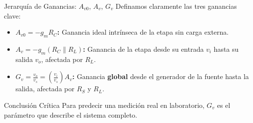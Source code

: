 \documentclass[aspectratio=169, table, xcdraw]{beamer}
\begin{document}
\begin{frame}{Jerarquía de Ganancias: $A_{v0}$, $A_v$, $G_v$}
    Definamos claramente las tres ganancias clave:
    
    \vspace{0.3cm}
    \begin{itemize}
        \item \textbf{$A_{v0} = -g_m R_C$:} Ganancia ideal intrínseca de la etapa sin carga externa.
        \item \textbf{$A_v = -g_m (R_C \parallel R_L)$:} Ganancia de la etapa desde su entrada $v_i$ hasta su salida $v_o$, afectada por $R_L$.
        \item \textbf{$G_v = \frac{v_o}{v_s} = \left(\frac{v_i}{v_s}\right) A_v$:} Ganancia \textbf{global} desde el generador de la fuente hasta la salida, afectada por $R_S$ y $R_L$.
    \end{itemize}
    
    \begin{alertblock}{Conclusión Crítica}
        Para predecir una medición real en laboratorio, \textbf{$G_v$} es el parámetro que describe el sistema completo.
    \end{alertblock}
\end{frame}
\end{document}
